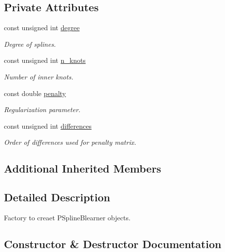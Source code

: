 \subsection*{Private Attributes}
\begin{DoxyCompactItemize}
\item 
const unsigned int \mbox{\hyperlink{classblearnerfactory_1_1_p_spline_blearner_factory_a8cfdf9e919e6392b2cba293dd5d931d5}{degree}}
\begin{DoxyCompactList}\small\item\em Degree of splines. \end{DoxyCompactList}\item 
const unsigned int \mbox{\hyperlink{classblearnerfactory_1_1_p_spline_blearner_factory_aa2fbd861eba158d220ecf96ddd1b50c5}{n\+\_\+knots}}
\begin{DoxyCompactList}\small\item\em Number of inner knots. \end{DoxyCompactList}\item 
const double \mbox{\hyperlink{classblearnerfactory_1_1_p_spline_blearner_factory_ae5bfe83b154898ad6cff26d56a82f540}{penalty}}
\begin{DoxyCompactList}\small\item\em Regularization parameter. \end{DoxyCompactList}\item 
const unsigned int \mbox{\hyperlink{classblearnerfactory_1_1_p_spline_blearner_factory_ae309d500aebc2abea96a639e431a3fb3}{differences}}
\begin{DoxyCompactList}\small\item\em Order of differences used for penalty matrix. \end{DoxyCompactList}\end{DoxyCompactItemize}
\subsection*{Additional Inherited Members}


\subsection{Detailed Description}
Factory to creaet {\ttfamily P\+Spline\+Blearner} objects. 

\subsection{Constructor \& Destructor Documentation}
\mbox{\label{classblearnerfactory_1_1_p_spline_blearner_factory_ac5218d98736f787d4a2cca8faf317470}} 

